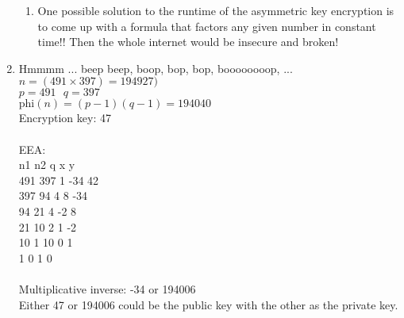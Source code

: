 \documentclass[a4paper, 11pt]{article}
\begin{document}
\begin{enumerate}
\begin{enumerate}
    \item
      One possible solution to the runtime of the asymmetric key
      encryption is to come up with a formula that factors any
      given number in constant time!!  Then the whole internet would
      be insecure and broken!

  \end{enumerate}

\item
  Hmmmm ... beep beep, boop, bop, bop, boooooooop, ...\\
  $n = (491 \times 397) = 194927)$\\
  $p = 491 \mbox{     } q = 397$\\
  $\mbox{phi}(n) = (p-1)(q-1) = 194040$\\
  Encryption key: 47 \\\\
  EEA:\\
  n1\hspace{8mm}   n2\hspace{8mm}  q\hspace{10mm} x \hspace{10mm} y \\
  491\hspace{6mm} 397\hspace{6mm}  1\hspace{10mm} -34\hspace{8mm} 42\\
  397\hspace{6mm}  94\hspace{8mm}  4\hspace{10mm} 8\hspace{11mm} -34\\
  94\hspace{8mm}   21\hspace{8mm}  4\hspace{10mm} -2\hspace{11mm} 8 \\
  21\hspace{8mm}   10\hspace{8mm}  2\hspace{10mm} 1\hspace{12mm}  -2\\
  10\hspace{8mm}    1\hspace{9mm} 10\hspace{9mm}  0\hspace{12mm}  1 \\
  1\hspace{10mm}    0\hspace{9mm} \hspace{13mm}   1\hspace{12mm}  0 \\
  \\Multiplicative inverse: -34 or 194006\\
  Either 47 or 194006 could be the public key with the other as the
  private key.



\end{enumerate}
\end{document}
